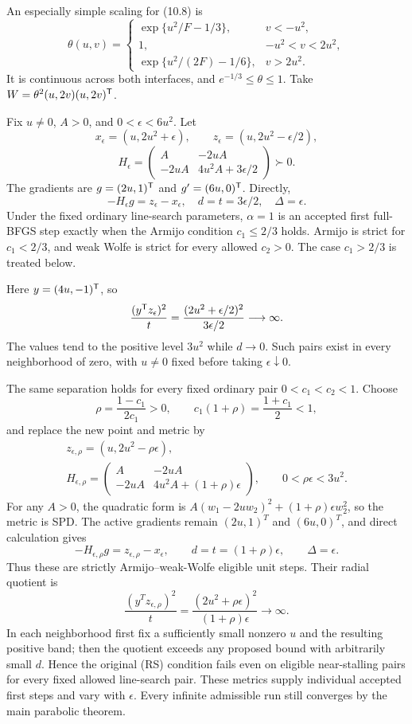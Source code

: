 An especially simple scaling for (10.8) is
\[
 \theta(u,v)=
 \begin{cases}
 \exp\{u^2/F-1/3\},&v<-u^2,\\
 1,&-u^2<v<2u^2,\\
 \exp\{u^2/(2F)-1/6\},&v>2u^2.
 \end{cases}
\]
It is continuous across both interfaces, and $e^{-1/3}\le\theta\le1$. Take $W=\theta^2(u,2v)(u,2v)^{\mathsf T}$.

Fix $u\ne0$, $A>0$, and $0<\epsilon<6u^2$. Let
\[
 x_\epsilon=(u,2u^2+\epsilon),\qquad
 z_\epsilon=(u,2u^2-\epsilon/2),
\]
\[
 H_\epsilon=
 \begin{pmatrix}
 A&-2uA\\-2uA&4u^2A+3\epsilon/2
 \end{pmatrix}\succ0.
\]
The gradients are $g=(2u,1)^{\mathsf T}$ and $g'=(6u,0)^{\mathsf T}$. Directly,
\[
 -H_\epsilon g=z_\epsilon-x_\epsilon,
 \quad d=t=3\epsilon/2,\quad \Delta=\epsilon.
\]
Under the fixed ordinary line-search parameters, $\alpha=1$ is an accepted first full-BFGS step exactly when the Armijo condition $c_1\le2/3$ holds. Armijo is strict for $c_1<2/3$, and weak Wolfe is strict for every allowed $c_2>0$. The case $c_1>2/3$ is treated below.

Here $y=(4u,-1)^{\mathsf T}$, so
\[
 \frac{(y^{\mathsf T} z_\epsilon)^2}{t}
 =\frac{(2u^2+\epsilon/2)^2}{3\epsilon/2}\longrightarrow\infty.
\]
The values tend to the positive level $3u^2$ while $d\to0$. Such pairs exist in every neighborhood of zero, with $u\ne0$ fixed before taking $\epsilon\downarrow0$.

The same separation holds for every fixed ordinary pair $0<c_1<c_2<1$. Choose
\[
 \rho=\frac{1-c_1}{2c_1}>0,
 \qquad c_1(1+\rho)=\frac{1+c_1}{2}<1,
\]
and replace the new point and metric by
\[
 \begin{gathered}
 z_{\epsilon,\rho}=(u,2u^2-\rho\epsilon),\\
 H_{\epsilon,\rho}=
 \begin{pmatrix}A&-2uA\\-2uA&4u^2A+(1+\rho)\epsilon\end{pmatrix},
 \qquad0<\rho\epsilon<3u^2.
 \end{gathered}
\]
For any $A>0$, the quadratic form is
$A(w_1-2uw_2)^2+(1+\rho)\epsilon w_2^2$, so the metric is SPD. The active gradients remain $(2u,1)^T$ and $(6u,0)^T$, and direct calculation gives
\[
 -H_{\epsilon,\rho}g=z_{\epsilon,\rho}-x_\epsilon,
 \qquad d=t=(1+\rho)\epsilon,\qquad\Delta=\epsilon.
\]
Thus these are strictly Armijo--weak-Wolfe eligible unit steps. Their radial quotient is
\[
 \frac{(y^Tz_{\epsilon,\rho})^2}{t}
 =\frac{(2u^2+\rho\epsilon)^2}{(1+\rho)\epsilon}
 \longrightarrow\infty.
\]
In each neighborhood first fix a sufficiently small nonzero $u$ and the resulting positive band; then the quotient exceeds any proposed bound with arbitrarily small $d$. Hence the original (RS) condition fails even on eligible near-stalling pairs for every fixed allowed line-search pair. These metrics supply individual accepted first steps and vary with $\epsilon$. Every infinite admissible run still converges by the main parabolic theorem.

